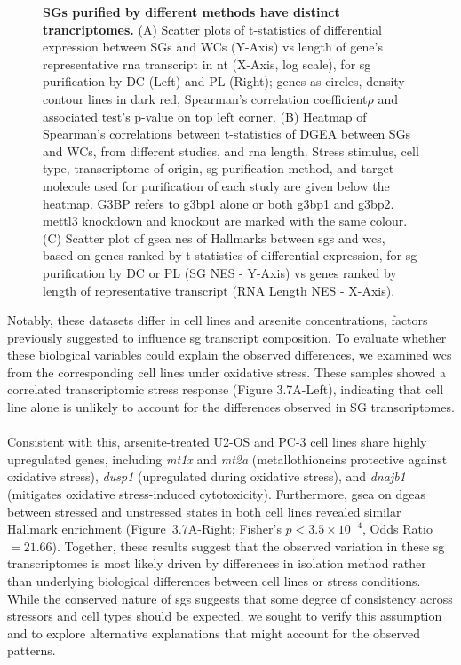 \begin{figure}[t]
	\captionsetup{labelformat=adja-page}
	\ContinuedFloat
	\caption[]{\textbf{SGs purified by different methods have distinct trancriptomes.} (A) Scatter plots of t-statistics of differential expression between SGs and WCs (Y-Axis) \gls{vs} length of gene’s representative \gls{rna} transcript in \gls{nt} (X-Axis, log scale), for \gls{sg} purification by DC\cite{khong_stress_2017} (Left) and PL\cite{somasekharan_g3bp1-linked_2020} (Right); genes as circles, density contour lines in dark red, Spearman's correlation coefficient$\rho$ and associated test's p-value on top left corner. (B) Heatmap of Spearman's correlations between t-statistics of DGEA between SGs and WCs, from different studies, and \gls{rna} length. Stress stimulus, cell type, transcriptome of origin, \gls{sg} purification method, and target molecule used for purification of each study are given below the heatmap. G3BP refers to \gls{g3bp1} alone or both \gls{g3bp1} and \gls{g3bp2}. \gls{mettl3} knockdown and knockout are marked with the same colour. (C) Scatter plot of \gls{gsea} \gls{nes} of Hallmarks between \glspl{sg} and \glspl{wc}, based on genes ranked by t-statistics of differential expression, for \gls{sg} purification by DC\cite{khong_stress_2017} or PL\cite{somasekharan_g3bp1-linked_2020} (SG NES - Y-Axis) \gls{vs} genes ranked by length of representative transcript (RNA Length NES - X-Axis).}
\end{figure}
\noindent
Notably, these datasets differ in cell lines and arsenite concentrations, factors previously suggested to influence \gls{sg} transcript composition. To evaluate whether these biological variables could explain the observed differences, we examined \glspl{wc} from the corresponding cell lines under oxidative stress. These samples showed a correlated transcriptomic stress response (Figure 3.7A-Left), indicating that cell line alone is unlikely to account for the differences observed in SG transcriptomes.
\\
\\
Consistent with this, arsenite-treated U2-OS and PC-3 cell lines share highly upregulated genes, including \textit{\gls{mt1x}} and\textit{ \gls{mt2a}} (metallothioneins protective against oxidative stress), \textit{\gls{dusp1}} (upregulated during oxidative stress), and \textit{\gls{dnajb1}} (mitigates oxidative stress-induced cytotoxicity). Furthermore, \gls{gsea} on \glspl{dgea} between stressed and unstressed states in both cell lines revealed similar Hallmark enrichment (Figure~3.7A-Right; Fisher's $p < 3.5 \times 10^{-4}$, Odds Ratio $= 21.66$). Together, these results suggest that the observed variation in these \gls{sg} transcriptomes is most likely driven by differences in isolation method rather than underlying biological differences between cell lines or stress conditions. While the conserved nature of \glspl{sg} suggests that some degree of consistency across stressors and cell types should be expected, we sought to verify this assumption and to explore alternative explanations that might account for the observed patterns.

